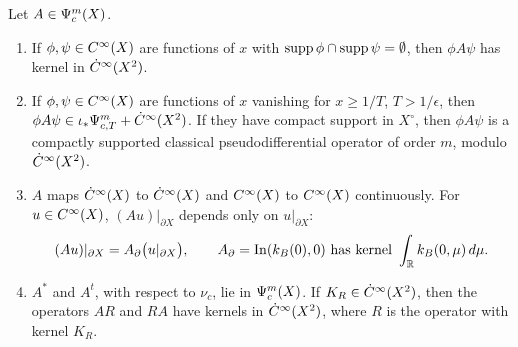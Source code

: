 \begin{lemma}\label{cc:lem:local}
Let \(A\in\Psi_{c}^m(X)\).
\begin{enumerate}
\item If \(\phi,\psi\in C^\infty(X)\) are functions of \(x\) with
\(\operatorname{supp}\phi\cap\operatorname{supp}\psi=\emptyset\), then \(\phi A\psi\) has kernel in
\(\dot C^\infty(X^2)\).
\item If \(\phi,\psi\in C^\infty(X)\) are functions of \(x\) vanishing for
\(x\ge1/T\), \(T>1/\epsilon\), then \(\phi A\psi\in
\iota_*\Psi_{c,T}^m+\dot C^\infty(X^2)\). If they have compact support in \(X^\circ\),
then \(\phi A\psi\) is a compactly supported classical pseudodifferential
operator of order \(m\), modulo \(\dot C^\infty(X^2)\).
\item \(A\) maps \(\dot C^\infty(X)\) to \(\dot C^\infty(X)\) and \(C^\infty(X)\) to
\(C^\infty(X)\) continuously. For \(u\in C^\infty(X)\), \((Au)|_{\partial X}\) depends
only on \(u|_{\partial X}\):
\begin{equation}\label{cc:eq:restriction}
 (Au)|_{\partial X}=A_\partial\bigl(u|_{\partial X}\bigr),\qquad
 A_\partial=\operatorname{In}(k_B(0),0)\ \text{has kernel}\ \int_\mathbb R k_B(0,\mu)\,d\mu .
\end{equation}
\item \(A^*\) and \(A^t\), with respect to \(\nu_c\), lie in \(\Psi_{c}^m(X)\).
If \(K_R\in\dot C^\infty(X^2)\), then the operators \(AR\) and \(RA\) have kernels
in \(\dot C^\infty(X^2)\), where \(R\) is the operator with kernel \(K_R\).
\end{enumerate}
\end{lemma}

